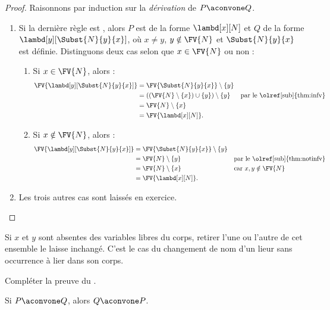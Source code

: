\documentclass[../../../include/open-logic-section]{subfiles}
\begin{document}
\begin{proof}
Raisonnons par induction sur la \emph{dérivation}
de $P \aconvone Q$.
\begin{enumerate}
\item Si la dernière règle est
  , alors $P$ est de
  la forme $\lambd[x][N]$ et $Q$ de la forme
  $\lambd[y][\Subst{N}{y}{x}]$, où
  $x \neq y$, $y \notin \FV{N}$ et
  $\Subst{N}{y}{x}$ est définie.
  Distinguons deux cas selon que
  $x \in \FV{N}$ ou non :
  \begin{enumerate}
  \item Si $x \in \FV{N}$, alors :
    \begin{align*}
      \FV{\lambd[y][\Subst{N}{y}{x}]}
      &= \FV{\Subst{N}{y}{x}} \setminus \{y\}\\
      &= ((\FV{N} \setminus \{x\}) \cup \{y\})
         \setminus \{y\}
         && \text{par le \olref[sub]{thm:infv}}\\
      &= \FV{N} \setminus \{x\}\\
      &= \FV{\lambd[x][N]}.
    \end{align*}
  \item Si $x \notin \FV{N}$, alors :
    \begin{align*}
      \FV{\lambd[y][\Subst{N}{y}{x}]}
      &= \FV{\Subst{N}{y}{x}} \setminus \{y\}\\
      &= \FV{N} \setminus \{y\}
         && \text{par le \olref[sub]{thm:notinfv}}\\
      &= \FV{N} \setminus \{x\}
         && \text{car $x,y\notin\FV{N}$}\\
      &= \FV{\lambd[x][N]}.
    \end{align*}
  \end{enumerate}
\item Les trois autres cas sont laissés
  en exercice.
\end{enumerate}
\end{proof}

\begin{explain}
Si $x$ et $y$ sont absentes des variables libres du corps,
retirer l'une ou l'autre de cet ensemble le laisse inchangé.
C'est le cas du changement de nom d'un lieur sans occurrence
à lier dans son corps.
\end{explain}

\begin{prob}
Compléter la preuve du
.
\end{prob}

\begin{lem}
Si $P \aconvone Q$, alors
$Q \aconvone P$.
\end{lem}
\end{document}
